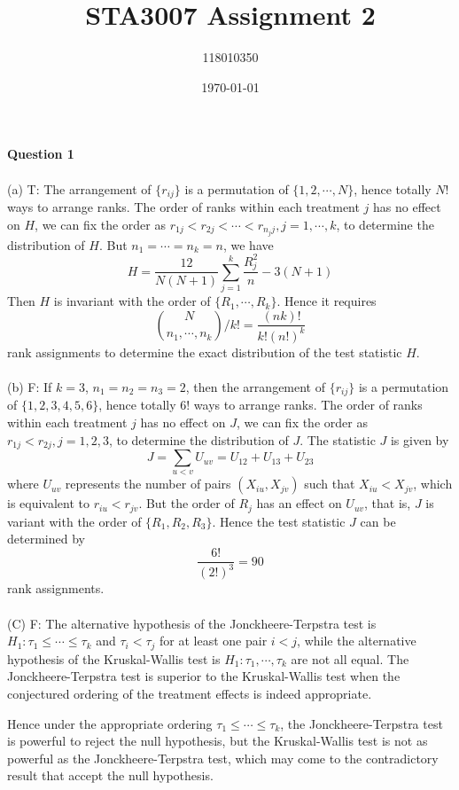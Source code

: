 \documentclass[12pt,a4paper]{article}
\begin{document}
	
\title{STA3007 Assignment 2}
\author{118010350}
\date{\today}
\maketitle	
	
\newpage

\textbf{Question 1}\\
~\\
(a) T: The arrangement of $\{r_{ij}\}$ is a permutation of $\{1,2,\cdots,N\}$, hence totally $N!$ ways to arrange ranks. The order of ranks within each treatment $j$ has no effect on $H$, we can fix the order as $r_{1j}<r_{2j}<\cdots<r_{n_{j}j},j=1,\cdots,k$, to determine the distribution of $H$. But $n_{1}=\cdots=n_{k}=n$, we have $$H=\frac{12}{N(N+1)}\sum_{j=1}^{k}\frac{R_{j}^{2}}{n}-3(N+1)$$ Then $H$ is invariant with the order of $\{R_{1},\cdots,R_{k}\}$. Hence it requires $${N\choose n_{1},\cdots,n_{k}}/k!=\frac{(nk)!}{k!(n!)^{k}}$$ rank assignments to determine the exact distribution of the test statistic $H$.\\
~\\
(b) F: If $k=3$, $n_{1}=n_{2}=n_{3}=2$, then the arrangement of $\{r_{ij}\}$ is a permutation of $\{1,2,3,4,5,6\}$, hence totally $6!$ ways to arrange ranks. The order of ranks within each treatment $j$ has no effect on $J$, we can fix the order as $r_{1j}<r_{2j},j=1,2,3$, to determine the distribution of $J$. The statistic $J$ is given by $$J=\sum_{u<v}U_{uv}=U_{12}+U_{13}+U_{23}$$ where $U_{uv}$ represents the number of pairs $(X_{iu},X_{jv})$ such that $X_{iu}<X_{jv}$, which is equivalent to $r_{iu}<r_{jv}$. But the order of $R_{j}$ has an effect on $U_{uv}$, that is, $J$ is variant with the order of $\{R_{1},R_{2},R_{3}\}$. Hence the test statistic $J$ can be determined by $$\frac{6!}{(2!)^{3}}=90$$ rank assignments.\\
~\\
(C) F: The alternative hypothesis of the Jonckheere-Terpstra test is $H_{1}:\tau_{1}\leqslant\cdots\leqslant\tau_{k}$ and $\tau_{i}<\tau_{j}$ for at least one pair $i<j$, while the alternative hypothesis of the Kruskal-Wallis test is $H_{1}:\tau_{1},\cdots,\tau_{k}$ are not all equal. 
The Jonckheere-Terpstra test is superior to the Kruskal-Wallis test when the conjectured ordering of the treatment effects is indeed appropriate. 

Hence under the appropriate ordering $\tau_{1}\leqslant\cdots\leqslant\tau_{k}$, the Jonckheere-Terpstra test is powerful to reject the null hypothesis, but the Kruskal-Wallis test is not as powerful as the Jonckheere-Terpstra test, which may come to the contradictory result that accept the null hypothesis.
\end{document}
